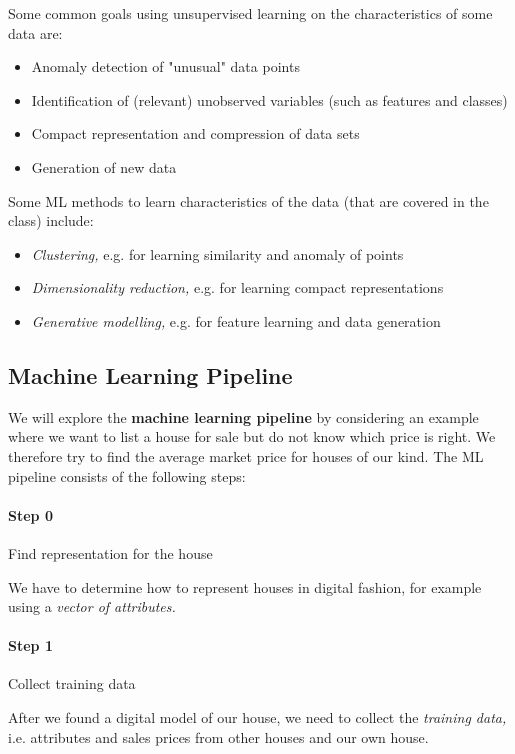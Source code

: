 \documentclass[a4paper]{extarticle}
\begin{document}
Some common goals using unsupervised learning on the characteristics of some data are:

\begin{itemize}
	\item Anomaly detection of "unusual" data points
	\item Identification of (relevant) unobserved variables (such as features and classes)
	\item Compact representation and compression of data sets
	\item Generation of new data
\end{itemize}

Some ML methods to learn characteristics of the data (that are covered in the class) include:

\begin{itemize}
	\item \textit{Clustering,} e.g. for learning similarity and anomaly of points
	\item \textit{Dimensionality reduction,} e.g. for learning compact representations
	\item \textit{Generative modelling,} e.g. for feature learning and data generation
\end{itemize}

\subsection{Machine Learning Pipeline}

We will explore the \textbf{machine learning pipeline} by considering an example where we want to list a house for sale but do not know which price is right. We therefore try to find the average market price for houses of our kind. The ML pipeline consists of the following steps:

\paragraph{Step 0} Find representation for the house

We have to determine how to represent houses in digital fashion, for example using a \textit{vector of attributes.}

\paragraph{Step 1} Collect training data

After we found a digital model of our house, we need to collect the \textit{training data,} i.e. attributes and sales prices from other houses and our own house.
\end{document}
